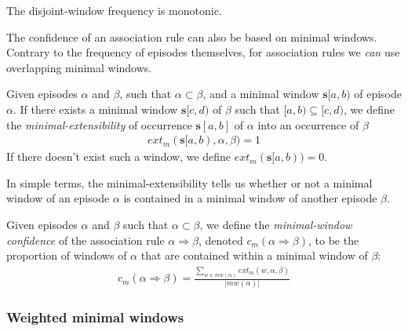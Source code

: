 The disjoint-window frequency is monotonic.

The confidence of an association rule can also be based on minimal windows. Contrary to the frequency of episodes themselves, for association rules we \emph{can} use overlapping minimal windows.

\begin{definition}
Given episodes $ \alpha $ and $ \beta $, such that $ \alpha \subset \beta $, and a minimal window $ \boldsymbol{s}[a, b) $ of episode $ \alpha $. If there exists a minimal window $ \boldsymbol{s}[c, d) $ of $ \beta $ such that
$ [a, b) \subseteq [c, d) $, we define the \emph{minimal-extensibility} of occurrence $ \boldsymbol{s}[a, b] $ of $ \alpha $ into an occurrence of $ \beta $
\begin{align*}
ext_m(\boldsymbol{s}[a, b), \alpha, \beta) = 1
\end{align*}
If there doesn't exist such a window, we define $ ext_m(\boldsymbol{s}[a,b)) = 0 $.
\end{definition}

In simple terms, the minimal-extensibility tells us whether or not a minimal window of an episode $ \alpha $ is contained in a minimal window of another episode $ \beta $.

\begin{definition}
Given episodes $ \alpha $ and $ \beta $ such that $ \alpha \subset \beta $, we define the \emph{minimal-window confidence} of the association rule $ \alpha \Rightarrow \beta $, denoted $ c_m(\alpha \Rightarrow \beta) $, to be the proportion of windows of $ \alpha $ that are contained within a minimal window of $ \beta $:
\begin{align*}
c_m(\alpha \Rightarrow \beta) = \frac{\sum_{w \in mw(\alpha)} ext_m(w, \alpha, \beta)}{| mw(\alpha) |}
\end{align*}
\end{definition}

\subsubsection{Weighted minimal windows}

